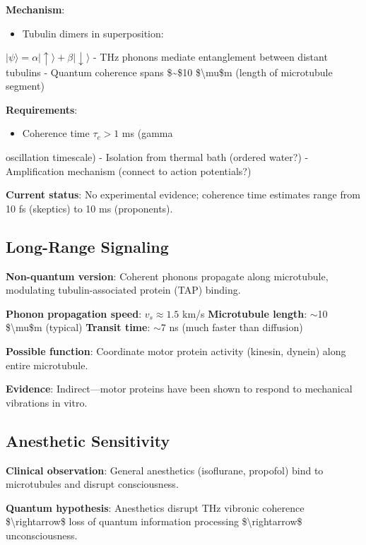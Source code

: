 \textbf{Mechanism}:
\begin{itemize}
\item Tubulin dimers in superposition:
\end{itemize}

\(|\psi\rangle = \alpha|\uparrow\rangle + \beta|\downarrow\rangle\) -
THz phonons mediate entanglement between distant tubulins - Quantum
coherence spans \$\sim\$10 \$\textbackslash mu\$m (length of microtubule
segment)

\textbf{Requirements}:
\begin{itemize}
\item Coherence time \(\tau_c > 1\) ms (gamma
\end{itemize}

oscillation timescale) - Isolation from thermal bath (ordered water?) -
Amplification mechanism (connect to action potentials?)

\textbf{Current status}: No experimental evidence; coherence time
estimates range from 10 fs (skeptics) to 10 ms (proponents).

\subsection{Long-Range Signaling}\label{long-range-signaling}

\textbf{Non-quantum version}: Coherent phonons propagate along
microtubule, modulating tubulin-associated protein (TAP) binding.

\textbf{Phonon propagation speed}: \(v_s \approx 1.5\) km/s
\textbf{Microtubule length}: $\sim$10 \$\textbackslash mu\$m
(typical) \textbf{Transit time}: $\sim$7 ns (much faster than
diffusion)

\textbf{Possible function}: Coordinate motor protein activity (kinesin,
dynein) along entire microtubule.

\textbf{Evidence}: Indirect---motor proteins have been shown to
respond to mechanical vibrations in vitro.

\subsection{Anesthetic Sensitivity}\label{anesthetic-sensitivity}

\textbf{Clinical observation}: General anesthetics (isoflurane,
propofol) bind to microtubules and disrupt consciousness.

\textbf{Quantum hypothesis}: Anesthetics disrupt THz vibronic coherence
\$\textbackslash rightarrow\$ loss of quantum information processing
\$\textbackslash rightarrow\$ unconsciousness.

